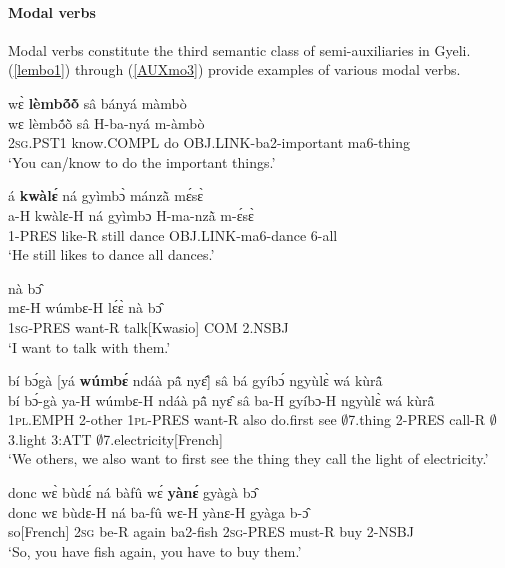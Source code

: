 \paragraph{Modal verbs}
Modal verbs constitute the third semantic class of semi-auxiliaries in Gyeli. (\ref{lembo1}) through (\ref{AUXmo3}) provide examples of various modal verbs.

\begin{exe} 
\ex\label{lembo1}
  \glll wɛ̀ {\bfseries lèmbṍõ̀} sâ bányá màmbò \\
       wɛ lèmbṍõ̀ sâ H-ba-nyá m-àmbò\\
        2\textsc{sg}.PST1 know.COMPL  do OBJ.LINK-ba2-important ma6-thing \\
    \trans `You can/know to do the important things.'
\end{exe}

\begin{exe} 
\ex\label{kwale1}
  \glll á {\bfseries kwàlɛ́} ná gyìmbɔ̀ mánzã̀ mɛ́sɛ̀ \\
       a-H kwàlɛ-H ná gyìmbɔ H-ma-nzã̀ m-ɛ́sɛ̀ \\
        1-PRES like-R still dance OBJ.LINK-ma6-dance 6-all \\
    \trans `He still likes to dance all dances.'
\end{exe}

\begin{exe} 
\ex\label{want1}
   nà bɔ̂\\
           mɛ-H wúmbɛ-H lɛ́ɛ̀ nà bɔ̂ \\
              1\textsc{sg}-PRES want-R talk[Kwasio] COM 2.NSBJ   \\
    \trans `I want to talk with them.'
\end{exe}

\begin{exe} 
\ex\label{want2} 
  \glll  bí bɔ́gà [yá {\bfseries wúmbɛ́} ndáà pã̂ nyɛ̂] sâ bá gyíbɔ́ ngyùlɛ̀ wá kùrã̂ \\
         bí bɔ́-gà ya-H wúmbɛ-H ndáà pã̂ nyɛ̂ sâ ba-H gyíbɔ-H ngyùlɛ̀ wá kùrã̂ \\
          1\textsc{pl}.EMPH 2-other 1\textsc{pl}-PRES want-R also do.first see $\emptyset$7.thing 2-PRES call-R $\emptyset$3.light 3:ATT $\emptyset$7.electricity[French]  \\
    \trans `We others, we also want to first see the thing they call the light of electricity.'
\end{exe}


\begin{exe} 
\ex\label{AUXmo3} 
  \glll  donc wɛ̀ bùdɛ́ ná bàfû wɛ́ {\bfseries yànɛ́} gyàgà bɔ̂\\
       donc wɛ bùdɛ-H ná ba-fû wɛ-H yànɛ-H gyàga b-ɔ̂ \\
        so[French] 2\textsc{sg} be-R again ba2-fish 2\textsc{sg}-PRES must-R buy 2-NSBJ  \\
    \trans `So, you have fish again, you have to buy them.'
\end{exe}



